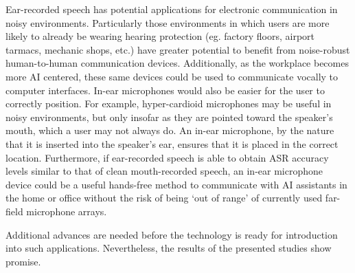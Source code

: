 Ear-recorded speech has potential applications for electronic communication in noisy environments.  Particularly those environments in which users are more likely to already be wearing hearing protection (eg. factory floors, airport tarmacs, mechanic shops, etc.) have greater potential to benefit from noise-robust human-to-human communication devices.  Additionally, as the workplace becomes more AI centered, these same devices could be used to communicate vocally to computer interfaces.  In-ear microphones would also be easier for the user to correctly position.  For example, hyper-cardioid microphones may be useful in noisy environments, but only insofar as they are pointed toward the speaker's mouth, which a user may not always do.  An in-ear microphone, by the nature that it is inserted into the speaker's ear, ensures that it is placed in the correct location.  Furthermore, if ear-recorded speech is able to obtain ASR accuracy levels similar to that of clean mouth-recorded speech, an in-ear microphone device could be a useful hands-free method to communicate with AI assistants in the home or office without the risk of being `out of range' of currently used far-field microphone arrays.

Additional advances are needed before the technology is ready for introduction into such applications.  Nevertheless, the results of the presented studies show promise.

